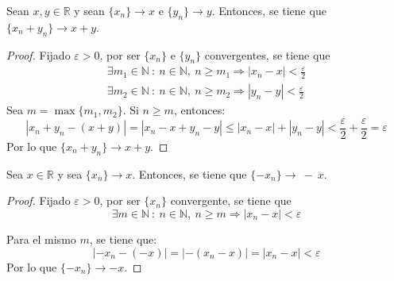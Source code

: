 \begin{prop}\label{prop:5.3.1}
    Sean $x,y \in \mathbb{R}$ y sean $\{x_n\} \longrightarrow x$ e $\{y_n\} \longrightarrow y$. Entonces, se tiene que $\{x_n + y_n\} \longrightarrow x+y$.
\end{prop}
\begin{proof}
    Fijado $\varepsilon > 0$, por ser $\{x_n\}$ e $\{y_n\}$ convergentes, se tiene que
    \begin{gather*}
        \exists m_1 \in \mathbb{N} ~:~ n \in \mathbb{N},~ n \geq m_1 \Longrightarrow \left|x_n - x \right| < \frac{\varepsilon}{2} \\
        \exists m_2 \in \mathbb{N} ~:~ n \in \mathbb{N},~ n \geq m_2 \Longrightarrow \left|y_n - y \right| < \frac{\varepsilon}{2}
    \end{gather*}
    Sea $m = \max \{m_1,m_2\}$. Si $ n \geq m$, entonces:
    \begin{equation*}
        \left|x_n + y_n - (x+y) \right| = \left|x_n - x + y_n - y \right| \leq |x_n - x| + |y_n - y| < \frac{\varepsilon}{2} + \frac{\varepsilon}{2} = \varepsilon
    \end{equation*}
    Por lo que $\{x_n + y_n\} \longrightarrow x+y$.
\end{proof}

\begin{prop}
    Sea $x \in \mathbb{R}$ y sea $\{x_n\} \longrightarrow x$. Entonces, se tiene que $\{-x_n\} \longrightarrow~-~x$.
\end{prop}
\begin{proof}
    Fijado $\varepsilon > 0$, por ser $\{x_n\}$ convergente, se tiene que
    \begin{equation*}
        \exists m \in \mathbb{N} ~:~ n \in \mathbb{N},~ n \geq m \Longrightarrow \left|x_n - x \right| < \varepsilon
    \end{equation*}
    
    Para el mismo $m$, se tiene que:
    \begin{equation*}
        |-x_n -(-x)| = |-(x_n - x)| = |x_n - x| < \varepsilon
    \end{equation*}
    Por lo que $\{-x_n\} \longrightarrow -x$.
\end{proof}

